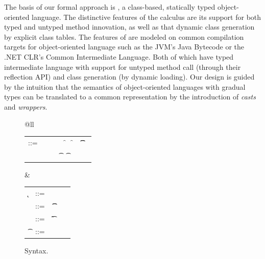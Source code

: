 \documentclass[acmsmall, anonymous, authordraft, review]{acmart} %
\begin{document}
\vspace{-5mm}

\noindent
The basis of our formal approach is \kafka, a class-based, statically typed
object-oriented language. The distinctive features of the calculus are its
support for both typed and untyped method innovation, as well as that
dynamic class generation by explicit class tables.  The features of \kafka
are modeled on common compilation targets for object-oriented language such
as the JVM's Java Bytecode or the .NET CLR's Common Intermediate
Language. Both of which have typed intermediate language with support for
untyped method call (through their reflection API) and class generation (by
dynamic loading).  Our design is guided by the intuition that the semantics
of object-oriented languages with gradual types can be translated to a
common representation by the introduction of \emph{casts} and
\emph{wrappers}.

\begin{figure}[!h]\hrulefill

\vspace{4mm}

\small\begin{tabular}{@{}ll}

\begin{minipage}{9cm}\begin{tabular}{@{}l@{~}l@{}l@{}l@{}l@{}l@{}l@{}l}
\e\hspace{.1cm} ::= & \hspace{.2cm} \x        
    &\B \this         
   &\B \that      
   &\B \FRead\f     
   &\B \FWrite\f\e   
   &\B \KCall\e\m\e\t\t \\
   & &
   &\B \SubCast\t\e 
   &\B \BehCast\t\e 
   &\B \New\C{\e[1]..}  
   &\B \DynCall\e\m\e 
\end{tabular}\end{minipage}&
\begin{minipage}{3.4cm}\begin{tabular}{l@{~}l@{}l@{}l}
  \k &::= \Class \C {\fd[1]..}{\md[1]..} \\
 \md &::= ~ \Mdef\m\x\t\t\e \\ 
 \fd &::= ~ \Fdef\f\t \\ 
  \t &::= ~ \any  \B   \C  \\ 
\end{tabular}\end{minipage} 
\end{tabular}

\vspace{4mm}

\noindent\hrulefill
\caption{\kafka Syntax.}\label{syn}
\end{figure}
\end{document}

